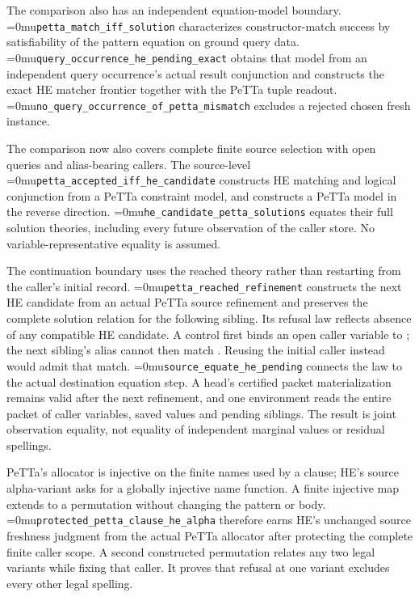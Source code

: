 \documentclass[11pt,a4paper]{article}
\newcommand{\code}[1]{\texttt{\detokenize{#1}}}
\newcommand{\name}[1]{\textup{\Urlmuskip=0mu\relax\nolinkurl{#1}}}
\begin{document}
The comparison also has an independent equation-model boundary.
\name{petta_match_iff_solution} characterizes constructor-match success by
satisfiability of the pattern equation on ground query data.
\name{query_occurrence_he_pending_exact} obtains that model from an
independent query occurrence's actual result conjunction and constructs the
exact HE matcher frontier together with the PeTTa tuple readout.
\name{no_query_occurrence_of_petta_mismatch} excludes a rejected chosen fresh
instance.

The comparison now also covers complete finite source selection with open
queries and alias-bearing callers. The source-level
\name{petta_accepted_iff_he_candidate} constructs HE matching and logical
conjunction from a PeTTa constraint model, and constructs a PeTTa model in the
reverse direction. \name{he_candidate_petta_solutions} equates their full
solution theories, including every future observation of the caller store.
No variable-representative equality is assumed.

The continuation boundary uses the reached theory rather than restarting
from the caller's initial record. \name{petta_reached_refinement} constructs
the next HE candidate from an actual PeTTa source refinement and preserves
the complete solution relation for the following sibling. Its refusal law
reflects absence of any compatible HE candidate. A control first binds an
open caller variable to \code{A}; the next sibling's alias cannot then match
\code{B}. Reusing the initial caller instead would admit that match.
\name{source_equate_he_pending} connects the law to the actual destination
equation step. A head's certified packet materialization remains valid after
the next refinement, and one environment reads the entire packet of caller
variables, saved values and pending siblings. The result is joint observation
equality, not equality of independent marginal values or residual spellings.

PeTTa's allocator is injective on the finite names used by a clause; HE's
source alpha-variant asks for a globally injective name function. A finite
injective map extends to a permutation without changing the pattern or body.
\name{protected_petta_clause_he_alpha} therefore earns HE's unchanged source
freshness judgment from the actual PeTTa allocator after protecting the
complete finite caller scope. A second constructed permutation relates any
two legal variants while fixing that caller. It proves that refusal at one
variant excludes every other legal spelling.
\end{document}
